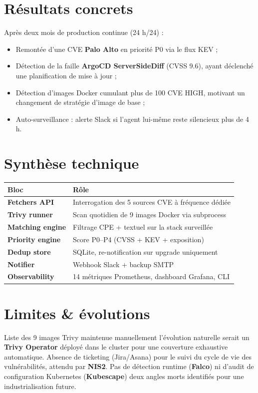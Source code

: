 \documentclass[11pt,a4paper]{article}
\begin{document}
\section{Résultats concrets}

Après deux mois de production continue (24 h/24) :

\begin{itemize}
  \item Remontée d'une CVE \textbf{Palo Alto} en priorité P0 via le flux KEV ;
  \item Détection de la faille \textbf{ArgoCD ServerSideDiff} (CVSS 9.6), ayant déclenché une planification de mise à jour ;
  \item Détection d'images Docker cumulant plus de 100 CVE HIGH, motivant un changement de stratégie d'image de base ;
  \item Auto-surveillance : alerte Slack si l'agent lui-même reste silencieux plus de 4 h.
\end{itemize}

\section{Synthèse technique}

\renewcommand{\arraystretch}{1.3}
\begin{tabularx}{\linewidth}{@{}>{\bfseries}p{2.6cm} X@{}}
\toprule
\rowcolor{light} Bloc & Rôle \\ \midrule
Fetchers API      & Interrogation des 5 sources CVE à fréquence dédiée \\
Trivy runner      & Scan quotidien de 9 images Docker via subprocess \\
Matching engine   & Filtrage CPE + textuel sur la stack surveillée \\
Priority engine   & Score P0--P4 (CVSS + KEV + exposition) \\
Dedup store       & SQLite, re-notification sur upgrade uniquement \\
Notifier          & Webhook Slack + backup SMTP \\
Observability     & 14 métriques Prometheus, dashboard Grafana, CLI \\
\bottomrule
\end{tabularx}

\section{Limites \& évolutions}

Liste des 9 images Trivy maintenue manuellement \textemdash{} l'évolution naturelle serait un \textbf{Trivy Operator} déployé dans le cluster pour une couverture exhaustive automatique. Absence de ticketing (Jira/Asana) pour le suivi du cycle de vie des vulnérabilités, attendu par \textbf{NIS2}. Pas de détection runtime (\textbf{Falco}) ni d'audit de configuration Kubernetes (\textbf{Kubescape}) \textemdash{} deux angles morts identifiés pour une industrialisation future.
\end{document}

